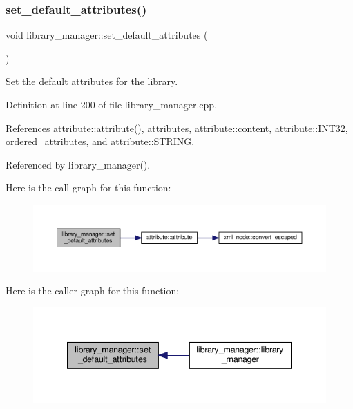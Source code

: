 \subsubsection{\texorpdfstring{set\+\_\+default\+\_\+attributes()}{set\_default\_attributes()}}
{\footnotesize\ttfamily void library\+\_\+manager\+::set\+\_\+default\+\_\+attributes (\begin{DoxyParamCaption}{ }\end{DoxyParamCaption})\hspace{0.3cm}{\ttfamily [private]}}



Set the default attributes for the library. 



Definition at line 200 of file library\+\_\+manager.\+cpp.



References attribute\+::attribute(), attributes, attribute\+::content, attribute\+::\+I\+N\+T32, ordered\+\_\+attributes, and attribute\+::\+S\+T\+R\+I\+NG.



Referenced by library\+\_\+manager().

Here is the call graph for this function\+:
\nopagebreak
\begin{figure}[H]
\begin{center}
\leavevmode
\includegraphics[width=350pt]{d8/d35/classlibrary__manager_a4e550de1a50f9e84f65c2fdd930f02b8_cgraph}
\end{center}
\end{figure}
Here is the caller graph for this function\+:
\nopagebreak
\begin{figure}[H]
\begin{center}
\leavevmode
\includegraphics[width=339pt]{d8/d35/classlibrary__manager_a4e550de1a50f9e84f65c2fdd930f02b8_icgraph}
\end{center}
\end{figure}
\mbox{\label{classlibrary__manager_aff9014fb417452bac4f6ab7942038f42}} 
